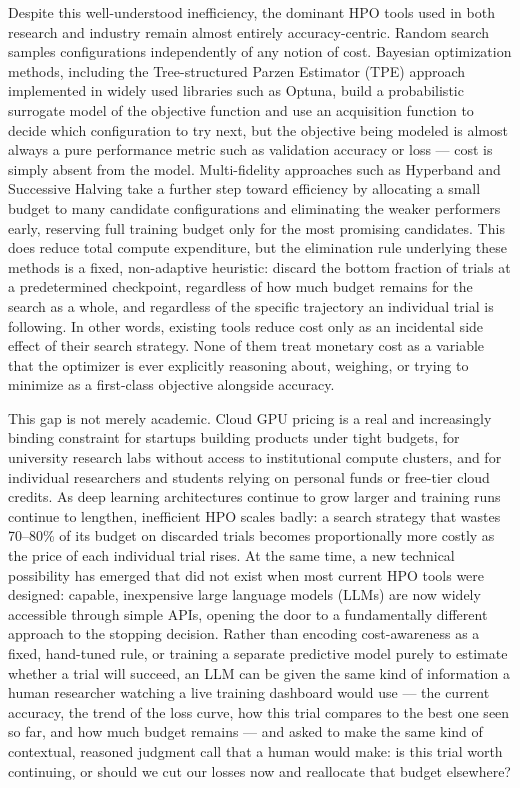 \documentclass[11pt]{article}
\begin{document}
Despite this well-understood inefficiency, the dominant HPO tools used in both research and industry remain almost entirely accuracy-centric. Random search samples configurations independently of any notion of cost. Bayesian optimization methods, including the Tree-structured Parzen Estimator (TPE) approach implemented in widely used libraries such as Optuna, build a probabilistic surrogate model of the objective function and use an acquisition function to decide which configuration to try next, but the objective being modeled is almost always a pure performance metric such as validation accuracy or loss --- cost is simply absent from the model. Multi-fidelity approaches such as Hyperband and Successive Halving take a further step toward efficiency by allocating a small budget to many candidate configurations and eliminating the weaker performers early, reserving full training budget only for the most promising candidates. This does reduce total compute expenditure, but the elimination rule underlying these methods is a fixed, non-adaptive heuristic: discard the bottom fraction of trials at a predetermined checkpoint, regardless of how much budget remains for the search as a whole, and regardless of the specific trajectory an individual trial is following. In other words, existing tools reduce cost only as an incidental side effect of their search strategy. None of them treat monetary cost as a variable that the optimizer is ever explicitly reasoning about, weighing, or trying to minimize as a first-class objective alongside accuracy.

This gap is not merely academic. Cloud GPU pricing is a real and increasingly binding constraint for startups building products under tight budgets, for university research labs without access to institutional compute clusters, and for individual researchers and students relying on personal funds or free-tier cloud credits. As deep learning architectures continue to grow larger and training runs continue to lengthen, inefficient HPO scales badly: a search strategy that wastes 70--80\% of its budget on discarded trials becomes proportionally more costly as the price of each individual trial rises. At the same time, a new technical possibility has emerged that did not exist when most current HPO tools were designed: capable, inexpensive large language models (LLMs) are now widely accessible through simple APIs, opening the door to a fundamentally different approach to the stopping decision. Rather than encoding cost-awareness as a fixed, hand-tuned rule, or training a separate predictive model purely to estimate whether a trial will succeed, an LLM can be given the same kind of information a human researcher watching a live training dashboard would use --- the current accuracy, the trend of the loss curve, how this trial compares to the best one seen so far, and how much budget remains --- and asked to make the same kind of contextual, reasoned judgment call that a human would make: is this trial worth continuing, or should we cut our losses now and reallocate that budget elsewhere?
\end{document}
